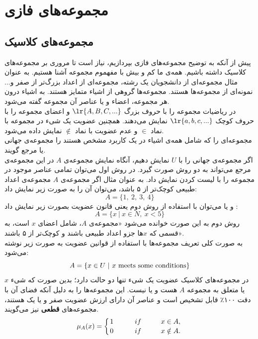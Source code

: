 \section{مجموعه‌های فازی}
 \subsection{مجموعه‌های کلاسیک}
پیش از آنکه به توضیح مجموعه‌های فازی بپردازیم، نیاز است تا مروری بر مجموعه‌های کلاسیک داشته باشیم. همه‌ی ما کم و بیش با مفهموم مجموعه آشنا هستیم. به عنوان مثال مجموعه‌ای از دانشجویان یک رشته، مجموعه‌ای از اعداد بزرگ‌تر از صفر و... نمونه‌ای از مجموعه‌ها هستند. مجموعه‌ها گروهی از اشیاء متمایز هستند. به اشیاء درون هر مجموعه، اعضاء و یا عناصر آن مجموعه گفته می‌شود. \\
در ریاضیات مجموعه را با حروف بزرگ 
$\lr{A,B,C,...}$
 و اعضای مجموعه را با حروف کوچک 
$\lr{a,b,c,...} $
  نمایش می‌دهند. همچنین عضویت یک شیء در مجموعه با نماد 
$\in$
 و عدم عضویت با نماد
 $\notin$
 نمایش داده می‌شود. 
 \cite{Bojadziev2007}
 \\
مجموعه‌ای را که شامل همه‌ی اشیاء در یک کاربرد مشخص هستند را مجموعه‌ی جهانی 
یا مرجع گویند. \\
اگر مجموعه‌ی جهانی را با $ U $  نمایش دهیم، آنگاه نمایش مجموعه‌ی $ A $  در این مجموعه‌ی مرجع می‌تواند به دو روش صورت گیرد. در روش اول می‌توان تمامی عناصر موجود در مجموعه را با لیست کردن 
نمایش داد. به عنوان مثال اگر مجموعه‌ی $ A $ مجموعه‌ی اعداد طبیعی کوچک‌تر از ۵ باشد، می‌توان آن را به صورت زیر نمایش داد:
$$ A=\{1,\ 2,\ 3,\ 4\} $$
و یا می‌توان با استفاده از روش دوم یعنی قانون عضویت
بصورت زیر نمایش داد
\cite{Wang1997}:
 $$A= \{ x\ |\ x \in N,\ x < 5\} $$
 روش دوم به این صورت خوانده می‌شود «مجموعه‌ی $ A $، شامل اعضای $ x $ است، به قسمی که  $ x $ها جزو اعداد طبیعی باشند و کوچک‌تر از ۵ باشند».\\
 به صورت کلی تعریف مجموعه‌ها با استفاده از قوانین عضویت به صورت زیر نوشته می‌شود:
\begin{equation}
 A= \{  x \in U\ |\   x\ {\rm meets\ some\ conditions } \}
 \end{equation} 
 در مجموعه‌های کلاسیک عضویت یک شیء تنها دو حالت دارد؛ بدین صورت که شیء $x$ یا متعلق به مجموعه $A$ هست و یا نیست. این مجموعه‌ها را به دلیل آنکه فضای آن با دقت ۱۰۰٪ قابل تشخیص است و عناصر آن دارای ارزش عضویت صفر و یا یک هستند، مجموعه‌های
  \textbf{قطعی}
  نیز می‌گویند. 
\begin{equation}\label{eq:e_classic_setdesc}
\mu_{A}(x)=\left \{ 
	{1 \atop 0}
	\hskip 1cm
   {if \hskip 1cm x \in A, \atop
	if \hskip 1cm x \notin A.} \right.
\end{equation} 

